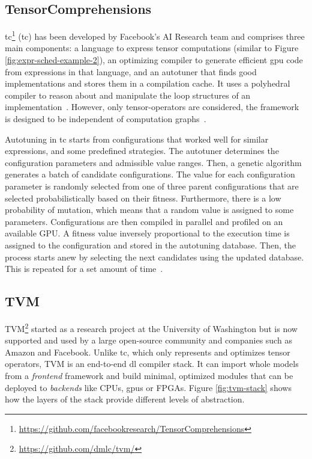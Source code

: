 \subsection{TensorComprehensions}
\acrlong{tc}\footnote{\url{https://github.com/facebookresearch/TensorComprehensions}} (\acrshort{tc}) has been developed by Facebook's AI Research team and comprises three main components: a language to express tensor computations (similar to Figure \ref{fig:expr-sched-example-2}), an optimizing compiler to generate efficient \gls{gpu} code from expressions in that language, and an autotuner that finds good implementations and stores them in a compilation cache. It uses a polyhedral compiler to reason about and manipulate the loop structures of an implementation~\cite[p.~3]{Vasilache.2018}. However, only tensor-operators are considered, the framework is designed to be independent of computation graphs~\cite[p.~4]{Vasilache.2018}.

Autotuning in \gls{tc} starts from configurations that worked well for similar expressions, and some predefined strategies. The autotuner determines the configuration parameters and admissible value ranges. Then, a genetic algorithm generates a batch of candidate configurations. The value for each configuration parameter is randomly selected from one of three parent configurations that are selected probabilistically based on their fitness. Furthermore, there is a low probability of mutation, which means that a random value is assigned to some parameters. Configurations are then compiled in parallel and profiled on an available GPU. A fitness value inversely proportional to the execution time is assigned to the configuration and stored in the autotuning database. Then, the process starts anew by selecting the next candidates using the updated database. This is repeated for a set amount of time~\cite[p.~15~f.]{Vasilache.2018}.

\subsection{TVM}
TVM\footnote{\url{https://github.com/dmlc/tvm/}} started as a research project at the University of Washington but is now supported and used by a large open-source community and companies such as Amazon and Facebook. Unlike \gls{tc}, which only represents and optimizes tensor operators, TVM is an end-to-end \gls{dl} compiler stack. It can import whole models from a \textit{frontend} framework and build minimal, optimized modules that can be deployed to \textit{backends} like CPUs, \glspl{gpu} or FPGAs. Figure \ref{fig:tvm-stack} shows how the layers of the stack provide different levels of abstraction.

